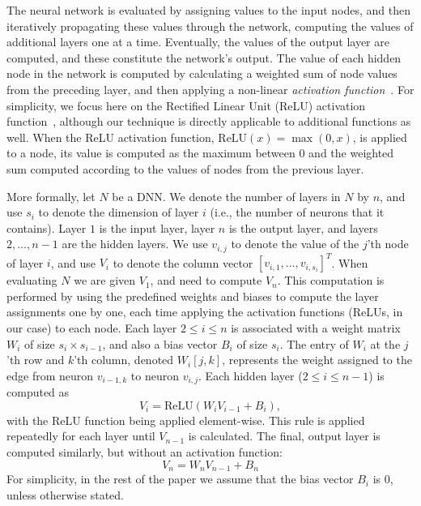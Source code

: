 \documentclass{easychair}
\newcommand{\relu}{\text{ReLU}\xspace{}}
\begin{document}
The neural network is evaluated by assigning values to the input
nodes, and then iteratively propagating these values through the
network, computing the values of additional layers one at a
time. Eventually, the values of the output layer are computed, and
these constitute the network's output.  The value of each hidden node
in the network is computed by calculating a weighted sum of node
values from the preceding layer, and then applying a non-linear
\emph{activation function}~\cite{FoBeCu16}.  For simplicity, we focus
here on the Rectified Linear Unit (ReLU) activation
function~\cite{NaHi10}, although our technique is directly applicable
to additional functions as well.  When the ReLU activation function,
$\relu{}(x) = \max{}(0, x)$, is applied to a node, its value is
computed as the maximum between $0$ and the weighted sum computed
according to the values of nodes from
the previous layer.

More formally, let $N$ be a DNN. We
denote the number of layers in $N$ by $n$, and use $s_i$ to denote the
dimension of layer $i$ (i.e., the number of neurons that it contains).
Layer $1$ is the input layer, layer $n$ is the output layer, and
layers $2,\ldots,n-1$ are the hidden layers.
We use $v_{i,j}$  to denote the value of the $j$'th node of layer $i$,
and use $V_i$ to denote the column vector $[v_{i,1},\ldots,v_{i,s_i}]^T$.
When evaluating $N$ we are given $V_1$, and need to compute $V_n$.
This computation is 
performed by using the predefined weights and biases to compute the
layer assignments one by one, each time applying the activation
functions (ReLUs, in our case) to each node. Each layer $2\leq i\leq
n$
is associated
with a 
weight matrix $W_i$ of size $s_{i}\times s_{i-1}$, and also a bias vector $B_i$ of size
$s_i$. The entry of $W_i$ at the $j$'th row and $k$'th column, denoted
$W_i[j,k]$, represents the weight assigned to the edge from
neuron $v_{i-1,k}$ to neuron $v_{i,j}$.
Each hidden layer ($2\leq i \leq n-1$) 
is computed as
\[
V_i = \relu{}(W_i  V_{i-1} + B_i),
\]
with the ReLU
function being applied element-wise.
This rule is applied repeatedly for each layer until $V_{n-1}$ is
calculated.
The final, output layer is
computed similarly, but without an activation function:
\[
  V_n = W_n  V_{n-1} + B_n
\]
For simplicity, in the rest of the paper we assume that 
the bias vector $B_i$ is $0$, unless otherwise stated.
\end{document}
